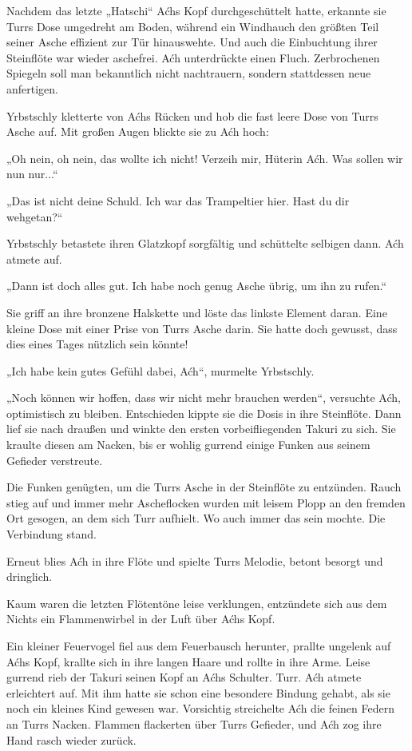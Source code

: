 Nachdem das letzte „Hatschi“ Aćhs Kopf durchgeschüttelt hatte, erkannte sie Turrs Dose umgedreht am Boden, während ein Windhauch den größten Teil seiner Asche effizient zur Tür hinauswehte. Und auch die Einbuchtung ihrer Steinflöte war wieder aschefrei. Aćh unterdrückte einen Fluch. Zerbrochenen Spiegeln soll man bekanntlich nicht nachtrauern, sondern stattdessen neue anfertigen.

Yrbstschly kletterte von Aćhs Rücken und hob die fast leere Dose von Turrs Asche auf. Mit großen Augen blickte sie zu Aćh hoch:

„Oh nein, oh nein, das wollte ich nicht! Verzeih mir, Hüterin Aćh. Was sollen wir nun nur...“

„Das ist nicht deine Schuld. Ich war das Trampeltier hier. Hast du dir wehgetan?“

Yrbstschly betastete ihren Glatzkopf sorgfältig und schüttelte selbigen dann. Aćh atmete auf.

„Dann ist doch alles gut. Ich habe noch genug Asche übrig, um ihn zu rufen.“

Sie griff an ihre bronzene Halskette und löste das linkste Element daran. Eine kleine Dose mit einer Prise von Turrs Asche darin. Sie hatte doch gewusst, dass dies eines Tages nützlich sein könnte!

„Ich habe kein gutes Gefühl dabei, Aćh“, murmelte Yrbstschly.

„Noch können wir hoffen, dass wir nicht mehr brauchen werden“, versuchte Aćh, optimistisch zu bleiben. Entschieden kippte sie die Dosis in ihre Steinflöte. Dann lief sie nach draußen und winkte den ersten vorbeifliegenden Takuri zu sich. Sie kraulte diesen am Nacken, bis er wohlig gurrend einige Funken aus seinem Gefieder verstreute.

Die Funken genügten, um die Turrs Asche in der Steinflöte zu entzünden. Rauch stieg auf und immer mehr Ascheflocken wurden mit leisem Plopp an den fremden Ort gesogen, an dem sich Turr aufhielt. Wo auch immer das sein mochte. Die Verbindung stand.

Erneut blies Aćh in ihre Flöte und spielte Turrs Melodie, betont besorgt und dringlich.

Kaum waren die letzten Flötentöne leise verklungen, entzündete sich aus dem Nichts ein Flammenwirbel in der Luft über Aćhs Kopf.

Ein kleiner Feuervogel fiel aus dem Feuerbausch herunter, prallte ungelenk auf Aćhs Kopf, krallte sich in ihre langen Haare und rollte in ihre Arme. Leise gurrend rieb der Takuri seinen Kopf an Aćhs Schulter. Turr. Aćh atmete erleichtert auf. Mit ihm hatte sie schon eine besondere Bindung gehabt, als sie noch ein kleines Kind gewesen war. Vorsichtig streichelte Aćh die feinen Federn an Turrs Nacken. Flammen flackerten über Turrs Gefieder, und Aćh zog ihre Hand rasch wieder zurück.

